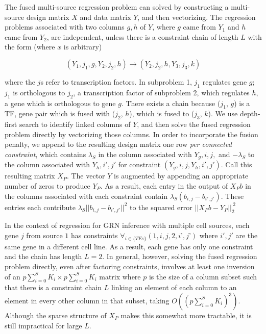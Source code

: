 \documentclass[11pt]{article}
\begin{document}

The fused multi-source regression problem can solved by constructing a multi-source design matrix $X$ and data matrix $Y$, and then vectorizing.
The regression problems associated with two columns $g,h$ of $Y$, where $g$ came from $Y_1$ and $h$ came from $Y_2$, are independent, unless there is a constraint chain of length $L$ with the form (where $x$ is arbitrary)

$$(Y_1, j_1, g, Y_2, j_2, h) \rightarrow (Y_2, j_2, h, Y_3, j_3, k)$$

where the $j$s refer to transcription factors. In subproblem 1, $j_1$ regulates gene $g$; $j_1$ is orthologous to $j_2$, a transcription factor of subproblem 2, which regulates $h$, a gene which is orthologous to gene $g$. There exists a chain because ($j_1$, $g$) is a TF, gene pair which is fused with ($j_2$, $h$), which is fused to ($j_3$, $k$).
We use depth-first search to identify linked columns of $Y$, and then solve the fused regression problem directly by vectorizing those columns.
In order to incorporate the fusion penalty, we append to the resulting design matrix one row \emph{per connected constraint}, which contains $\lambda_S$ in the column associated with $Y_g,i,j,$ and $-\lambda_S$ to the column associated with $Y_h, i',j'$ for constraint $(Y_g,i,j,Y_h,i',j')$. Call this resulting matrix $X_P$.
The vector $Y$ is augmented by appending an appropriate number of zeros to produce $Y_P$. As a result, each entry in the output of $X_P b$ in the columns associated with each constraint contain $\lambda_S(b_{i,j} - b_{i',j'})$.
These entries each contribute  $\lambda_S||b_{i,j} - b_{i',j'}||^{2}$ to the squared error $||X_Pb - Y_P||_2^{~2}$

In the context of regression for GRN inference with multiple cell sources, each gene $j$ from source $1$ has constraints $\forall_{i \in \{TFs\}} (1, i, j, 2, i’, j’)$ where $i',j'$ are the same gene in a different cell line.
As a result, each gene has only one constraint and the chain has length $L=2$.
In general, however, solving the fused regression problem directly, even after factoring constraints, involves at least one inversion of an $p\sum_{i=0}^S K_i \times p \sum_{i=0}^S K_i$ matrix where $p$ is the size of a column subset such that there is a constraint chain $L$ linking an element of each column to an element in every other column in that subset, taking $O((p\sum_{i=0}^S K_i)^3)$.
Although the sparse structure of $X_P$ makes this somewhat more tractable, it is still impractical for large $L$.
\end{document}
